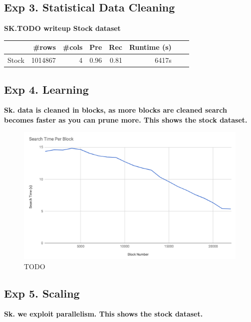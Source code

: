 

\subsection*{Exp 3. Statistical Data Cleaning}

\textbf{SK.TODO writeup Stock dataset}


\begin{table}[ht]
\centering
\begin{tabular}{|l|r|r|r|r|r|r|r|}
\hline
 & \#rows & \#cols & Pre & Rec & Runtime (s) \\
\hline
Stock	&1014867&4& 0.96&	0.81&	6417s\\
\hline
\end{tabular}
\end{table}



\subsection*{Exp 4. Learning}


\textbf{Sk. data is cleaned in blocks, as more blocks are cleaned search becomes faster as you can prune more. This shows the stock dataset.}

 \begin{figure}[ht]
\centering
 \includegraphics[width=0.9\columnwidth]{figures/draft-blocks.png}
 \caption{TODO
 \label{fig:opt}}
\end{figure}


\subsection*{Exp 5. Scaling}
\textbf{Sk. we exploit parallelism. This shows the stock dataset.}

